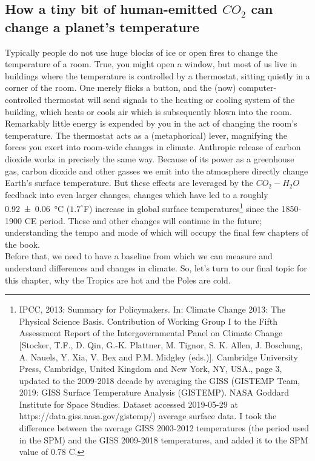 \subsection{How a tiny bit of human-emitted $CO_2$ can change a planet's temperature}
Typically people do not use huge blocks of ice or open fires to change the temperature of a room. True, you might open a window, but most of us live in buildings where the temperature is controlled by a thermostat, sitting quietly in a corner of the room. One merely flicks a button, and the (now) computer-controlled thermostat will send signals to the heating or cooling system of the building, which heats or cools air which is subsequently blown into the room. Remarkably little energy is expended by you in the act of changing the room's temperature. The thermostat acts as a (metaphorical) lever, magnifying the forces you exert into room-wide changes in climate. Anthropic release of carbon dioxide works in precisely the same way. Because of its power as a greenhouse gas, carbon dioxide and other gasses we emit into the atmosphere directly change Earth's surface temperature. But these effects are leveraged by the $CO_2-H_2O$ feedback into even larger changes, changes which have led to a roughly \SI[separate-uncertainty]{0.92(6)}{\celsius} ($1.7^{\circ}$F) increase in global surface temperatures\footnote{IPCC, 2013: Summary for Policymakers. In: Climate Change 2013: The Physical Science Basis. Contribution of Working Group I to the Fifth Assessment Report of the Intergovernmental Panel on Climate Change [Stocker, T.F., D. Qin, G.-K. Plattner, M. Tignor, S. K. Allen, J. Boschung, A. Nauels, Y. Xia, V. Bex and P.M. Midgley (eds.)]. Cambridge University Press, Cambridge, United Kingdom and New York, NY, USA., page 3, updated to the 2009-2018 decade by averaging the GISS (GISTEMP Team, 2019: GISS Surface Temperature Analysis (GISTEMP). NASA Goddard Institute for Space Studies. Dataset accessed 2019-05-29 at https://data.giss.nasa.gov/gistemp/) average surface data. I took the difference between the average GISS 2003-2012 temperatures (the period used in the SPM) and the GISS 2009-2018 temperatures, and added it to the SPM value of 0.78 C.} since the 1850-1900 CE period. These and other changes will continue in the future; understanding the tempo and mode of which will occupy the final few chapters of the book.\\

Before that, we need to have a baseline from which we can measure and understand differences and changes in climate. So, let's turn to our final topic for this chapter, why the Tropics are hot and the Poles are cold.

